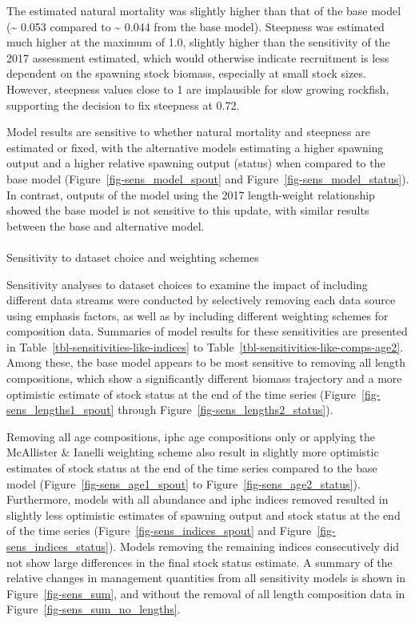 \documentclass[
]{scrartcl}
\makeatletter
\let\oldparagraph\paragraph
\renewcommand{\paragraph}{
    \@ifstar
      \xxxParagraphStar
      \xxxParagraphNoStar
  }
\newcommand{\xxxParagraphStar}[1]{\oldparagraph*{#1}\mbox{}}
\newcommand{\xxxParagraphNoStar}[1]{\oldparagraph{#1}\mbox{}}
\makeatother
\begin{document}
The estimated natural mortality was slightly higher than that of the
base model (\textasciitilde{} 0.053 compared to \textasciitilde{} 0.044
from the base model). Steepness was estimated much higher at the maximum
of 1.0, slightly higher than the sensitivity of the 2017 assessment
estimated, which would otherwise indicate recruitment is less dependent
on the spawning stock biomass, especially at small stock sizes. However,
steepness values close to 1 are implausible for slow growing rockfish,
supporting the decision to fix steepness at 0.72.

Model results are sensitive to whether natural mortality and steepness
are estimated or fixed, with the alternative models estimating a higher
spawning output and a higher relative spawning output (status) when
compared to the base model (Figure~\ref{fig-sens_model_spout} and
Figure~\ref{fig-sens_model_status}). In contrast, outputs of the model
using the 2017 length-weight relationship showed the base model is not
sensitive to this update, with similar results between the base and
alternative model.

\paragraph{Sensitivity to dataset choice and weighting
schemes}\label{sensitivity-to-dataset-choice-and-weighting-schemes}

Sensitivity analyses to dataset choices to examine the impact of
including different data streams were conducted by selectively removing
each data source using emphasis factors, as well as by including
different weighting schemes for composition data. Summaries of model
results for these sensitivities are presented in
Table~\ref{tbl-sensitivities-like-indices} to
Table~\ref{tbl-sensitivities-like-comps-age2}. Among these, the base
model appears to be most sensitive to removing all length compositions,
which show a significantly different biomass trajectory and a more
optimistic estimate of stock status at the end of the time series
(Figure~\ref{fig-sens_lengths1_spout} through
Figure~\ref{fig-sens_lengths2_status}).

Removing all age compositions, \gls{iphc} age compositions only or
applying the McAllister \& Ianelli weighting scheme also result in
slightly more optimistic estimates of stock status at the end of the
time series compared to the base model (Figure~\ref{fig-sens_age1_spout}
to Figure~\ref{fig-sens_age2_status}). Furthermore, models with all
abundance and \gls{iphc} indices removed resulted in slightly less
optimistic estimates of spawning output and stock status at the end of
the time series (Figure~\ref{fig-sens_indices_spout} and
Figure~\ref{fig-sens_indices_status}). Models removing the remaining
indices consecutively did not show large differences in the final stock
status estimate. A summary of the relative changes in management
quantities from all sensitivity models is shown in
Figure~\ref{fig-sens_sum}, and without the removal of all length
composition data in Figure~\ref{fig-sens_sum_no_lengths}.
\end{document}
